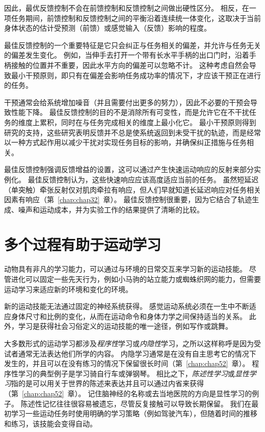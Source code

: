 因此，最优反馈控制不会在前馈控制和反馈控制之间做出硬性区分。
相反，在一项任务期间，前馈控制和反馈控制之间的平衡沿着连续统一体变化，这取决于当前身体状态的估计受预测（前馈）或感觉输入（反馈）影响的程度。


最佳反馈控制的一个重要特征是它只会纠正与任务相关的偏差，并允许与任务无关的偏差发生变化。
例如，当伸手去打开一个带有长水平手柄的出口门时，沿着手柄接触的位置并不重要，因此水平方向的偏差可以忽略不计。
这种考虑自然会导致最小干预原则，即只有在偏差会影响任务成功率的情况下，才应该干预正在进行的任务。


干预通常会给系统增加噪音（并且需要付出更多的努力），因此不必要的干预会导致性能下降。
最佳反馈控制的目的不是消除所有可变性，而是允许它在不干扰任务的维度上累积，同时在与任务完成相关的维度上最小化它。
最小干预原则得到研究的支持，这些研究表明反馈并不总是使系统返回到未受干扰的轨迹，而是经常以一种方式起作用以减少干扰对实现任务目标的影响，并确保纠正措施与任务相关。


最佳反馈控制强调反馈增益的设置，这可以通过产生快速运动响应的反射来部分实例化。
最佳反馈控制认为，这些快速响应应该高度适应当前的任务。
虽然短延迟（单突触）牵张反射仅对肌肉牵拉有响应，但人们早就知道长延迟响应对任务相关因素有响应（第~\ref{chap:chap32}~章）。
最佳反馈控制很重要，因为它结合了轨迹生成、噪声和运动成本，并为实验工作的结果提供了清晰的比较。



\section{多个过程有助于运动学习}

动物具有非凡的学习能力，可以通过与环境的日常交互来学习新的运动技能。
尽管进化可以固定一些先天行为，例如小马驹的站立能力或蜘蛛织网的能力，但需要运动学习来适应新的环境和变化的环境。


新的运动技能无法通过固定的神经系统获得。
感觉运动系统必须在一生中不断适应身体尺寸和比例的变化，从而在运动命令和身体力学之间保持适当的关系。
此外，学习是获得社会习俗定义的运动技能的唯一途径，例如写作或跳舞。


大多数形式的运动学习都涉及\textit{程序性}学习或\textit{内隐性}学习，之所以这样称呼是因为受试者通常无法表达他们所学的内容。
内隐学习通常是在没有自主思考它的情况下发生的，并且可以在没有练习的情况下保留很长时间（第~\ref{chap:chap52}~章）。
程序性学习的典型例子是学习骑自行车或弹钢琴。
相比之下，\textit{陈述性学习}或\textit{显性学习}指的是可以用关于世界的陈述来表达并且可以通过内省来获得（第~\ref{chap:chap52}~章）。
记住脑神经的名称或去当地医院的方向是显性学习的例子。
陈述性记忆往往很容易被遗忘，尽管反复接触可以导致长期保留。
我们在最初学习一些运动任务时使用明确的学习策略（例如驾驶汽车），但随着时间的推移和练习，该技能会变得自动。


